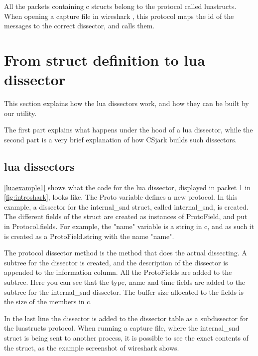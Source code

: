 All the \glspl{packet} containing \Gls{c} \glspl{struct} belong to the \gls{protocol} called luastructs.
When opening a capture file in \Gls{wireshark} , this \gls{protocol} maps the id of the messages to the correct \gls{dissector},
and calls them.



\section*{From \gls{struct} definition to \Gls{lua} \gls{dissector}}
This section explains how the \Gls{lua} \glspl{dissector} work, and how they can be built by our \gls{utility}.

The first part explains what happens under the hood of a \Gls{lua} \gls{dissector}, while 
the second part is a very brief explanation of how CSjark builds such \glspl{dissector}.

\subsection*{\Gls{lua} \glspl{dissector}}

\autoref{luaexample1} shows what the code for the \Gls{lua} \gls{dissector}, displayed in \gls{packet} 1 in \autoref{fig:introshark}, looks like.
The Proto variable defines a new \gls{protocol}. In this example, a \gls{dissector} for the internal\_snd \gls{struct}, called internal\_snd, is created. 
The different fields of the \gls{struct} are created as instances of ProtoField, and put in Protocol.fields.
For example, the "name" variable is a \gls{string} in \Gls{c}, and as such it is created as a ProtoField.\gls{string} with the 
name "name".

The \gls{protocol} \gls{dissector} method is the method that does the actual dissecting.
A subtree for the \gls{dissector} is created, and the description of the \gls{dissector} is appended to the information column.
All the ProtoFields are added to the subtree. Here you can see that the type, name and time fields are added to the subtree for the internal\_snd \gls{dissector}.
The buffer size allocated to the fields is the size of the \glspl{member} in \Gls{c}.

In the last line the \gls{dissector} is added to the \gls{dissector} table as a subdissector for the luastructs \gls{protocol}.
When running a capture file, where the internal\_snd \gls{struct} is being sent to another \gls{process}, it is possible to see the exact contents of the \gls{struct}, as the example screenshot of \Gls{wireshark} shows.

